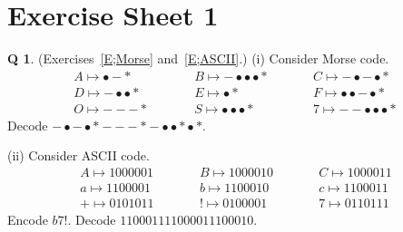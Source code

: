 \documentclass[12pt,a4paper]{article}
\theoremstyle{plain}
\theoremstyle{definition}
\newtheorem{question}[theorem]{Q}
\begin{document}
    \section{Exercise Sheet 1}
    \begin{question}
        \label{C1.1}
        (Exercises~\ref{E;Morse} and~\ref{E;ASCII}.) (i)
        Consider Morse code.
        \begin{align*}
            A\mapsto \bullet-*\qquad
            &&B\mapsto -\bullet\bullet\bullet*\qquad
            &&C\mapsto-\bullet-\bullet*\\
            D\mapsto -\bullet\bullet*\qquad
            &&E\mapsto \bullet*\qquad
            &&F\mapsto\bullet\bullet-\bullet*\\
            O\mapsto ---*\qquad
            &&S\mapsto\bullet\bullet\bullet*\qquad
            &&7\mapsto--\bullet\bullet\bullet*
        \end{align*}
        Decode
        $-\bullet-\bullet*---*-\bullet\bullet* \bullet*$.


        (ii) Consider ASCII code.
        \begin{align*}
            A\mapsto 1000001\qquad
            &&B\mapsto 1000010\qquad
            &&C\mapsto 1000011\\
            a\mapsto 1100001\qquad
            &&b\mapsto 1100010 \qquad
            &&c\mapsto 1100011\\
            +\mapsto 0101011\qquad
            &&!\mapsto 0100001\qquad
            &&7\mapsto 0110111
        \end{align*}
        Encode $b7!$. Decode $110001111000011100010$.
    \end{question}
\end{document}
